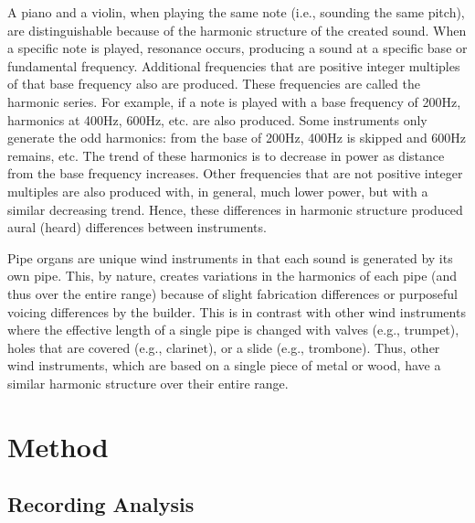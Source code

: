 \documentclass[twocolumn]{article}
\begin{document}
A piano and a violin, when playing the same note (i.e., sounding the same pitch), are distinguishable because of the harmonic structure of the created sound. When a specific note is played, resonance occurs, producing a sound at a specific base or fundamental frequency. Additional frequencies that are positive integer multiples of that base frequency also are produced. These frequencies are called the harmonic series. For example, if a note is played with a base frequency of 200Hz, harmonics at 400Hz, 600Hz, etc. are also produced. Some instruments only generate the odd harmonics: from the base of 200Hz, 400Hz is skipped and 600Hz remains, etc. The trend of these harmonics is to decrease in power as distance from the base frequency increases. Other frequencies that are not positive integer multiples are also produced with, in general, much lower power, but with a similar decreasing trend. Hence, these differences in harmonic structure produced aural (heard) differences between instruments.

Pipe organs are unique wind instruments in that each sound is generated by its own pipe. This, by nature, creates variations in the harmonics of each pipe (and thus over the entire range) because of slight fabrication differences or purposeful voicing differences by the builder. This is in contrast with other wind instruments where the effective length of a single pipe is changed with valves (e.g., trumpet), holes that are covered (e.g., clarinet), or a slide (e.g., trombone). Thus, other wind instruments, which are based on a single piece of metal or wood, have a similar harmonic structure over their entire range.

\section{Method}

\subsection{Recording Analysis}
\end{document}
